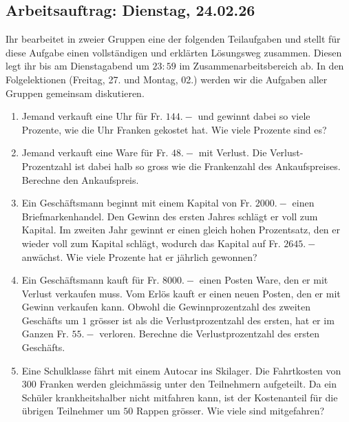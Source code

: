 \documentclass[11pt,oneside]{article}
\begin{document}
\subsection*{Arbeitsauftrag: Dienstag, 24.02.26}
Ihr bearbeitet in zweier Gruppen eine der folgenden Teilaufgaben und stellt für diese Aufgabe einen vollständigen und erklärten Lösungsweg zusammen. Diesen legt ihr bis am Dienstagabend um $23:59$ im Zusammenarbeitsbereich ab. In den Folgelektionen (Freitag, 27. und Montag, 02.) werden wir die Aufgaben aller Gruppen gemeinsam diskutieren.
\begin{aufgabe}
	\begin{enumerate}
		\item Jemand verkauft eine Uhr für Fr. $144.-$ und gewinnt dabei so viele Prozente, wie die Uhr Franken gekostet hat. Wie viele Prozente sind es?
		\item Jemand verkauft eine Ware für Fr. $48.-$ mit Verlust. Die Verlust-Prozentzahl ist dabei halb so gross wie die Frankenzahl des Ankaufspreises. Berechne den Ankaufspreis.
		\item Ein Geschäftsmann beginnt mit einem Kapital von Fr. $2000.-$ einen Briefmarkenhandel. Den Gewinn des ersten Jahres schlägt er voll zum Kapital. Im zweiten Jahr gewinnt er	einen gleich hohen Prozentsatz, den er wieder voll zum Kapital schlägt, wodurch das Kapital auf Fr. $2645.-$ anwächst. Wie viele Prozente hat er jährlich gewonnen?
		\item Ein Geschäftsmann kauft für Fr. $8000.-$ einen Posten Ware, den er mit Verlust verkaufen muss. Vom Erlös kauft er einen neuen Posten, den er mit Gewinn verkaufen kann. Obwohl die Gewinnprozentzahl des zweiten Geschäfts um $1$ grösser ist als die Verlustprozentzahl des ersten, hat er im Ganzen Fr. $55.-$ verloren. Berechne die Verlustprozentzahl des
		ersten Geschäfts.
		\item Eine Schulklasse fährt mit einem Autocar ins Skilager. Die Fahrtkosten von $300$ Franken	werden gleichmässig unter den Teilnehmern aufgeteilt. Da ein Schüler krankheitshalber nicht mitfahren kann, ist der Kostenanteil für die übrigen Teilnehmer um $50$ Rappen
		grösser. Wie viele sind mitgefahren?
	\end{enumerate}
\end{aufgabe}
\end{document}

